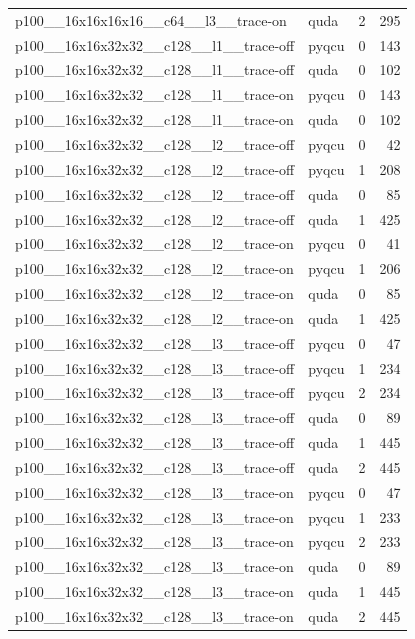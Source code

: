 \begin{table}[htbp]
\begin{tabular}{@{}llrr@{}}
p100\_\_16x16x16x16\_\_c64\_\_l3\_\_trace-on & quda & 2 & 295 \\
p100\_\_16x16x32x32\_\_c128\_\_l1\_\_trace-off & pyqcu & 0 & 143 \\
p100\_\_16x16x32x32\_\_c128\_\_l1\_\_trace-off & quda & 0 & 102 \\
p100\_\_16x16x32x32\_\_c128\_\_l1\_\_trace-on & pyqcu & 0 & 143 \\
p100\_\_16x16x32x32\_\_c128\_\_l1\_\_trace-on & quda & 0 & 102 \\
p100\_\_16x16x32x32\_\_c128\_\_l2\_\_trace-off & pyqcu & 0 & 42 \\
p100\_\_16x16x32x32\_\_c128\_\_l2\_\_trace-off & pyqcu & 1 & 208 \\
p100\_\_16x16x32x32\_\_c128\_\_l2\_\_trace-off & quda & 0 & 85 \\
p100\_\_16x16x32x32\_\_c128\_\_l2\_\_trace-off & quda & 1 & 425 \\
p100\_\_16x16x32x32\_\_c128\_\_l2\_\_trace-on & pyqcu & 0 & 41 \\
p100\_\_16x16x32x32\_\_c128\_\_l2\_\_trace-on & pyqcu & 1 & 206 \\
p100\_\_16x16x32x32\_\_c128\_\_l2\_\_trace-on & quda & 0 & 85 \\
p100\_\_16x16x32x32\_\_c128\_\_l2\_\_trace-on & quda & 1 & 425 \\
p100\_\_16x16x32x32\_\_c128\_\_l3\_\_trace-off & pyqcu & 0 & 47 \\
p100\_\_16x16x32x32\_\_c128\_\_l3\_\_trace-off & pyqcu & 1 & 234 \\
p100\_\_16x16x32x32\_\_c128\_\_l3\_\_trace-off & pyqcu & 2 & 234 \\
p100\_\_16x16x32x32\_\_c128\_\_l3\_\_trace-off & quda & 0 & 89 \\
p100\_\_16x16x32x32\_\_c128\_\_l3\_\_trace-off & quda & 1 & 445 \\
p100\_\_16x16x32x32\_\_c128\_\_l3\_\_trace-off & quda & 2 & 445 \\
p100\_\_16x16x32x32\_\_c128\_\_l3\_\_trace-on & pyqcu & 0 & 47 \\
p100\_\_16x16x32x32\_\_c128\_\_l3\_\_trace-on & pyqcu & 1 & 233 \\
p100\_\_16x16x32x32\_\_c128\_\_l3\_\_trace-on & pyqcu & 2 & 233 \\
p100\_\_16x16x32x32\_\_c128\_\_l3\_\_trace-on & quda & 0 & 89 \\
p100\_\_16x16x32x32\_\_c128\_\_l3\_\_trace-on & quda & 1 & 445 \\
p100\_\_16x16x32x32\_\_c128\_\_l3\_\_trace-on & quda & 2 & 445 \\

\end{tabular}
\end{table}
